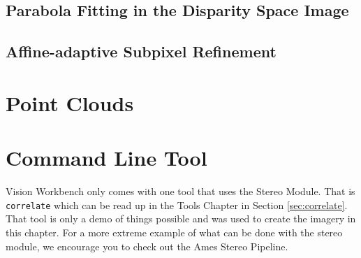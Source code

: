 \subsection{Parabola Fitting in the Disparity Space Image}

\subsection{Affine-adaptive Subpixel Refinement}



\section{Point Clouds}
\label{sec:command_line_tools}

\section{Command Line Tool}
\label{sec:command_line_tool}

Vision Workbench only comes with one tool that uses the Stereo
Module. That is \verb#correlate# which can be read up in the Tools
Chapter in Section \ref{sec:correlate}. That tool is only a demo of
things possible and was used to create the imagery in this chapter. For
a more extreme example of what can be done with the stereo module, we
encourage you to check out the Ames Stereo Pipeline.

\begin{thebibliography}{1}

\end{thebibliography}
